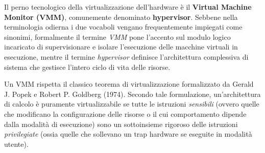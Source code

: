 \documentclass[11pt, a4paper]{article}
\begin{document}
Il perno tecnologico della virtualizzazione dell'hardware è il \textbf{Virtual Machine Monitor (VMM)}, comunemente denominato \textbf{hypervisor}. Sebbene nella terminologia odierna i due vocaboli vengano frequentemente impiegati come sinonimi, formalmente il termine \emph{VMM} pone l'accento sul modulo logico incaricato di supervisionare e isolare l'esecuzione delle macchine virtuali in esecuzione, mentre il termine \emph{hypervisor} definisce l'architettura complessiva di sistema che gestisce l'intero ciclo di vita delle risorse.

Un VMM rispetta il classico teorema di virtualizzazione formalizzato da Gerald J. Popek e Robert P. Goldberg (1974). Secondo tale formulazione, un'architettura di calcolo è puramente virtualizzabile se tutte le istruzioni \emph{sensibili} (ovvero quelle che modificano la configurazione delle risorse o il cui comportamento dipende dalla modalità di esecuzione) sono un sottoinsieme rigoroso delle istruzioni \emph{privilegiate} (ossia quelle che sollevano un trap hardware se eseguite in modalità utente).
\end{document}
